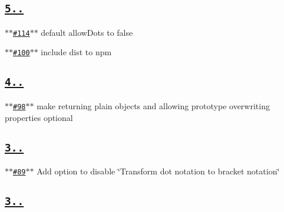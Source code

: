 \subsection*{\href{https://github.com/ljharb/qs/issues?milestone=28&state=closed}{\tt {\bfseries 5..}}}


\begin{DoxyItemize}
\item \href{https://github.com/ljharb/qs/issues/114}{\tt $\ast$$\ast$\#114$\ast$$\ast$} default allow\+Dots to false
\item \href{https://github.com/ljharb/qs/issues/100}{\tt $\ast$$\ast$\#100$\ast$$\ast$} include dist to npm
\end{DoxyItemize}

\subsection*{\href{https://github.com/ljharb/qs/issues?milestone=26&state=closed}{\tt {\bfseries 4..}}}


\begin{DoxyItemize}
\item \href{https://github.com/ljharb/qs/issues/98}{\tt $\ast$$\ast$\#98$\ast$$\ast$} make returning plain objects and allowing prototype overwriting properties optional
\end{DoxyItemize}

\subsection*{\href{https://github.com/ljharb/qs/issues?milestone=24&state=closed}{\tt {\bfseries 3..}}}


\begin{DoxyItemize}
\item \href{https://github.com/ljharb/qs/issues/89}{\tt $\ast$$\ast$\#89$\ast$$\ast$} Add option to disable \char`\"{}\+Transform dot notation to bracket notation\char`\"{}
\end{DoxyItemize}

\subsection*{\href{https://github.com/ljharb/qs/issues?milestone=23&state=closed}{\tt {\bfseries 3..}}}


